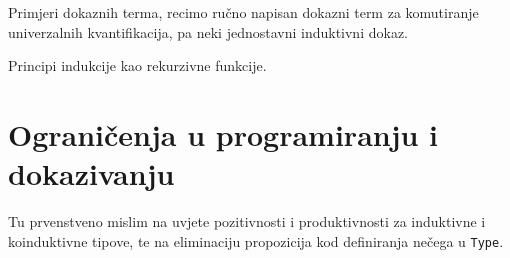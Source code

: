 Primjeri dokaznih terma, recimo ručno napisan dokazni term za komutiranje univerzalnih kvantifikacija, pa neki jednostavni induktivni dokaz.

Principi indukcije kao rekurzivne funkcije.

\section{Ograničenja u programiranju i dokazivanju}\label{sec:ogranicenja}
Tu prvenstveno mislim na uvjete pozitivnosti i produktivnosti za induktivne i koinduktivne tipove,
te na eliminaciju propozicija kod definiranja nečega u \texttt{Type}.

